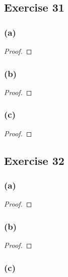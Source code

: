 \documentclass[14pt]{extarticle}
\begin{document}
\subsection{Exercise 31}

\subsubsection{(a)}

\begin{proof}

\end{proof}

\subsubsection{(b)}

\begin{proof}

\end{proof}

\subsubsection{(c)}

\begin{proof}

\end{proof}

\subsection{Exercise 32}

\subsubsection{(a)}

\begin{proof}

\end{proof}

\subsubsection{(b)}

\begin{proof}

\end{proof}

\subsubsection{(c)}
\end{document}
